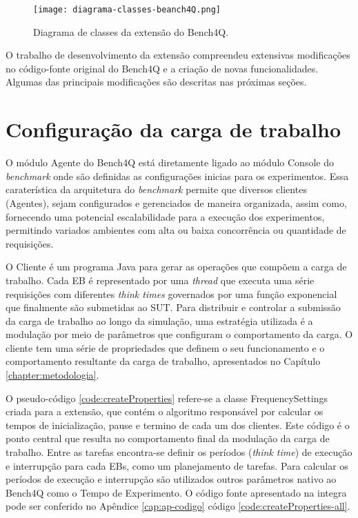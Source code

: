 \begin{figure}[!htb]
	\centering
	\texttt{[image: diagrama-classes-beanch4Q.png]}	
	\caption{Diagrama de classes da extensão do Bench4Q.}
	\label{fig:diagrama-classes}
	\fautor
\end{figure}

O trabalho de desenvolvimento da extensão compreendeu extensivas modificações no código-fonte original do Bench4Q e a criação de novas funcionalidades. Algumas das principais modificações são descritas nas próximas seções.

\section{Configuração da carga de trabalho}
O módulo Agente do Bench4Q está diretamente ligado ao módulo Console do \textit{benchmark} onde são definidas as configurações inicias para os experimentos. Essa caraterística da arquitetura do \textit{benchmark} permite que diversos clientes (Agentes), sejam configurados e gerenciados de maneira organizada, assim como, fornecendo uma potencial escalabilidade para a execução dos experimentos, permitindo variados ambientes com alta ou baixa concorrência ou quantidade de requisições.

O Cliente é um programa Java para gerar as operações que compõem a carga de trabalho. Cada EB é representado por uma \textit{thread} que executa uma série requisições com diferentes \textit{think times} governados por uma função exponencial que finalmente são submetidas ao SUT. Para distribuir e controlar a submissão da carga de trabalho ao longo da simulação, uma estratégia utilizada é a modulação por meio de parâmetros que configuram o comportamento da carga. O cliente tem uma série de propriedades que definem o seu funcionamento e o comportamento resultante da carga de trabalho, apresentados no Capítulo \ref{chapter:metodologia}. 

O pseudo-código \ref{code:createProperties} refere-se a classe \textsf{FrequencySettings} criada para a extensão, que contém o algoritmo responsável por calcular os tempos de inicialização, pause e termino de cada um dos clientes. Este código é o ponto central que resulta no comportamento final da modulação da carga de trabalho. Entre as tarefas encontra-se definir os períodos (\textit{think time}) de execução e interrupção para cada EBs, como um planejamento de tarefas. Para calcular os períodos de execução e interrupção são utilizados outros parâmetros nativo ao Bench4Q como o Tempo de Experimento. O código fonte apresentado na integra pode ser conferido no Apêndice \ref{cap:ap-codigo} código \ref{code:createProperties-all}.

